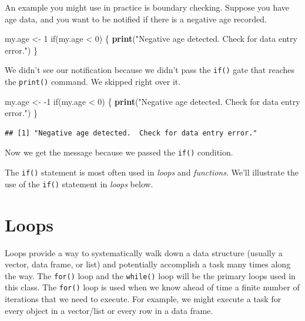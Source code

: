 \documentclass[]{book}
\newenvironment{Shaded}{\begin{snugshade}}{\end{snugshade}}
\newcommand{\KeywordTok}[1]{\textcolor[rgb]{0.13,0.29,0.53}{\textbf{{#1}}}}
\newcommand{\DecValTok}[1]{\textcolor[rgb]{0.00,0.00,0.81}{{#1}}}
\newcommand{\StringTok}[1]{\textcolor[rgb]{0.31,0.60,0.02}{{#1}}}
\newcommand{\NormalTok}[1]{{#1}}
\begin{document}
An example you might use in practice is boundary checking. Suppose you
have age data, and you want to be notified if there is a negative age
recorded.

\begin{Shaded}
\begin{Highlighting}[]
\NormalTok{my.age <-}\StringTok{ }\DecValTok{1}
\NormalTok{if(my.age <}\StringTok{ }\DecValTok{0}\NormalTok{) \{}
  \KeywordTok{print}\NormalTok{(}\StringTok{"Negative age detected.  Check for data entry error."}\NormalTok{)}
\NormalTok{\}}
\end{Highlighting}
\end{Shaded}

We didn't see our notification because we didn't pass the \texttt{if()}
gate that reaches the \texttt{print()} command. We skipped right over
it.

\begin{Shaded}
\begin{Highlighting}[]
\NormalTok{my.age <-}\StringTok{ }\NormalTok{-}\DecValTok{1}
\NormalTok{if(my.age <}\StringTok{ }\DecValTok{0}\NormalTok{) \{}
  \KeywordTok{print}\NormalTok{(}\StringTok{"Negative age detected.  Check for data entry error."}\NormalTok{)}
\NormalTok{\}}
\end{Highlighting}
\end{Shaded}

\begin{verbatim}
## [1] "Negative age detected.  Check for data entry error."
\end{verbatim}

Now we get the message because we passed the \texttt{if()} condition.

The \texttt{if()} statement is most often used in \emph{loops} and
\emph{functions}. We'll illustrate the use of the \texttt{if()}
statement in \emph{loops} below.

\section{Loops}\label{loops}

Loops provide a way to systematically walk down a data structure
(usually a vector, data frame, or list) and potentially accomplish a
task many times along the way. The \texttt{for()} loop and the
\texttt{while()} loop will be the primary loops used in this class. The
\texttt{for()} loop is used when we know ahead of time a finite number
of iterations that we need to execute. For example, we might execute a
task for every object in a vector/list or every row in a data frame.
\end{document}
